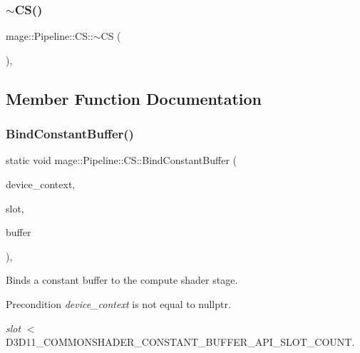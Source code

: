 \hypertarget{structmage_1_1_pipeline_1_1_c_s_a8061d73f9cc268ce883dd0fd3c9f094c}{}\label{structmage_1_1_pipeline_1_1_c_s_a8061d73f9cc268ce883dd0fd3c9f094c} 
\subsubsection{\texorpdfstring{$\sim$\+C\+S()}{~CS()}}
{\footnotesize\ttfamily mage\+::\+Pipeline\+::\+C\+S\+::$\sim$\+CS (\begin{DoxyParamCaption}{ }\end{DoxyParamCaption})\hspace{0.3cm}{\ttfamily [private]}, {\ttfamily [delete]}}



\subsection{Member Function Documentation}
\hypertarget{structmage_1_1_pipeline_1_1_c_s_ad8bb2fdda63ef3f3befe8a8354e591cc}{}\label{structmage_1_1_pipeline_1_1_c_s_ad8bb2fdda63ef3f3befe8a8354e591cc} 
\subsubsection{\texorpdfstring{Bind\+Constant\+Buffer()}{BindConstantBuffer()}}
{\footnotesize\ttfamily static void mage\+::\+Pipeline\+::\+C\+S\+::\+Bind\+Constant\+Buffer (\begin{DoxyParamCaption}\item[{I\+D3\+D11\+Device\+Context4 $\ast$}]{device\+\_\+context,  }\item[{\hyperlink{namespacemage_a41c104c036fba3756a74e19f793eeaa1}{U32}}]{slot,  }\item[{I\+D3\+D11\+Buffer $\ast$}]{buffer }\end{DoxyParamCaption})\hspace{0.3cm}{\ttfamily [static]}, {\ttfamily [noexcept]}}

Binds a constant buffer to the compute shader stage.

\begin{DoxyPrecond}{Precondition}
{\itshape device\+\_\+context} is not equal to {\ttfamily nullptr}. 

{\itshape slot} $<$ {\ttfamily D3\+D11\+\_\+\+C\+O\+M\+M\+O\+N\+S\+H\+A\+D\+E\+R\+\_\+\+C\+O\+N\+S\+T\+A\+N\+T\+\_\+\+B\+U\+F\+F\+E\+R\+\_\+\+A\+P\+I\+\_\+\+S\+L\+O\+T\+\_\+\+C\+O\+U\+NT}. 
\end{DoxyPrecond}

